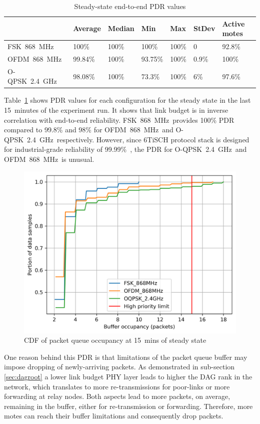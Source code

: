 \documentclass[sensors,article,submit,moreauthors,pdftex]{Definitions/mdpi}
\newcommand{\fsk}          {FSK~868~MHz}
\newcommand{\oqpsk}        {O-QPSK~2.4~GHz}
\newcommand{\ofdm}         {OFDM~868~MHz}
\begin{document}
\begin{table}
    \centering
    \begin{tabular}{|l|l|l|l|l|l|l|}
        \hline
                & Average & Median & Min     & Max   & StDev & Active motes \\ \hline
        \fsk\   & 100\%   & 100\%  & 100\%   & 100\% & 0     & 92.8\%       \\ \hline
        \ofdm\  & 99.84\% & 100\%  & 93.75\% & 100\% & 0.9\% & 100\%        \\ \hline
        \oqpsk\ & 98.08\% & 100\%  & 73.3\%  & 100\% & 6\%   & 97.6\%       \\ \hline
    \end{tabular}
    \caption{Steady-state end-to-end PDR values}
    \label{tab:pdr_table}
\end{table}


Table~\ref{tab:pdr_table} shows PDR values for each configuration for the steady state in the last 15~minutes of the experiment run. 
It shows that link budget is in inverse correlation with end-to-end reliability.
\fsk\ provides 100\% PDR compared to 99.8\% and 98\% for \ofdm\ and \oqpsk\ respectively.
However, since 6TiSCH protocol stack is designed for industrial-grade reliability of 99.99\%~\cite{vucinic20key}, the PDR for \oqpsk\ and \ofdm\ is unusual.

\begin{figure}
	\centering
	\includegraphics[width=0.49\columnwidth]{maxBufferSize_cdf_plot_full_steady_15}
	\caption{CDF of packet queue occupancy at 15~mins of steady state}
    \label{fig:maxBufferSize_cdf_plot_full_steady_15}
\end{figure}


One reason behind this PDR is that limitations of the packet queue buffer may impose dropping of newly-arriving packets.
As demonstrated in sub-section \ref{sec:dagroot} a lower link budget PHY layer leads to higher the DAG rank in the network, which translates to more re-transmissions for poor-links or more forwarding at relay nodes. 
Both aspects lead to more packets, on average, remaining in the buffer, either for re-transmission or forwarding.
Therefore, more motes can reach their buffer limitations and consequently drop packets.
\end{document}
